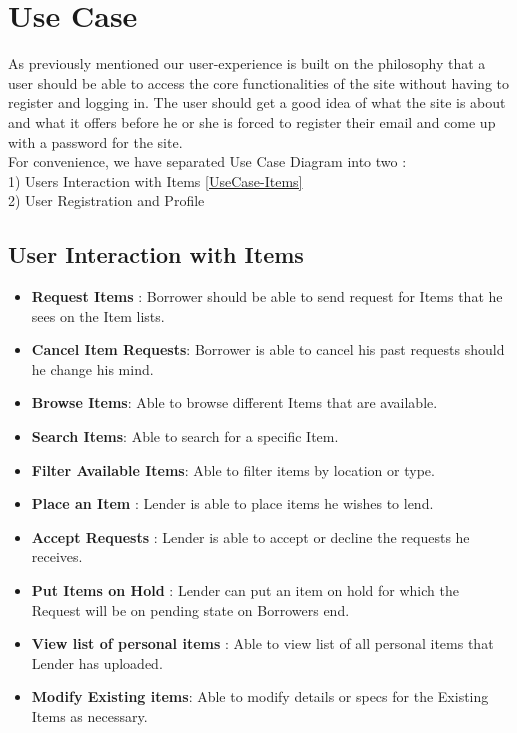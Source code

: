 \documentclass[a4paper]{article}
\begin{document}
\section{Use Case } As previously mentioned our user-experience is built on the philosophy that a user should be able to access the core functionalities of the site without having to register and logging in. The user should get a good idea of what the site is about and what it offers before he or she is forced to register their email and come up with a password for the site. \\
For convenience, we have separated Use Case Diagram into two : \\ 
1) Users Interaction with Items \ref{UseCase-Items}  \\ 
2) User Registration and Profile \\

\subsection{User Interaction with Items}
\begin{itemize}
\item \textbf{Request Items} : Borrower should be able to send request for Items that he sees on the Item lists.
\item \textbf{Cancel Item Requests}: Borrower is able to cancel his past requests should he change his mind.
\item \textbf{Browse Items}: Able to browse different Items that are available.
\item \textbf{Search Items}: Able to search for a specific Item.
\item \textbf{Filter Available Items}: Able to filter items by location or type.
\item \textbf{Place an Item} : Lender is able to place items he wishes to lend.
\item \textbf{Accept Requests} : Lender is able to accept or decline the requests he receives.
\item \textbf{Put Items on Hold} : Lender can put an item on hold for which the Request will be on pending state on Borrowers end.
\item \textbf{View list of personal items} : Able to view list of all personal items that Lender has uploaded.
\item \textbf{Modify Existing items}: Able to modify details or specs for the Existing Items as necessary.
\end{itemize}
\end{document}
